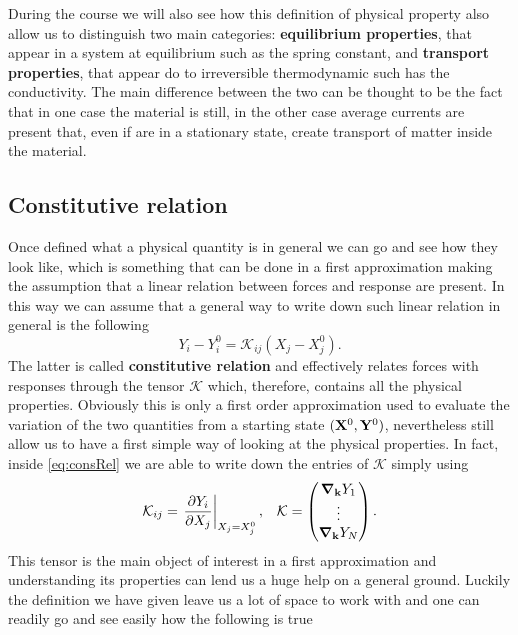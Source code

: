 During the course we will also see how this definition of physical property also allow us to distinguish two main categories: \textbf{equilibrium properties}, that appear in a system at equilibrium such as the spring constant, and \textbf{transport properties}, that appear do to irreversible thermodynamic such has the conductivity. The main difference between the two can be thought to be the fact that in one case the material is still, in the other case average currents are present that, even if are in a stationary state, create transport of matter inside the material.

\subsection{Constitutive relation}

Once defined what a physical quantity is in general we can go and see how they look like, which is something that can be done in a first approximation making the assumption that a linear relation between forces and response are present. In this way we can assume that a general way to write down such linear relation in general is the following
\begin{equation}
    \label{eq:consRel}
    Y_i - Y_i^0 = \mathcal{K}_{ij}(X_j - X_j^0).
\end{equation}
The latter is called \textbf{constitutive relation} and effectively relates forces with responses through the tensor $\mathcal{K}$ which, therefore, contains all the physical properties. Obviously this is only a first order approximation used to evaluate the variation of the two quantities from a starting state $(\vb{X}^0, \vb{Y}^0)$, nevertheless still allow us to have a first simple way of looking at the physical properties. In fact, inside \eqref{eq:consRel} we are able to write down the entries of $\mathcal{K}$ simply using
\begin{align}
    \label{eq:defOfK}
    &\mathcal{K}_{ij} = \eval{\pderivative{Y_i}{X_j}}_{X_j=X_j^0}, &\mathcal{K} = \begin{pmatrix}
        \grad_{\vb{k}}Y_1\\
        \vdots\\
        \grad_{\vb{k}}Y_N
    \end{pmatrix}.
\end{align}
This tensor is the main object of interest in a first approximation and understanding its properties can lend us a huge help on a general ground. Luckily the definition we have given leave us a lot of space to work with and one can readily go and see easily how the following is true
